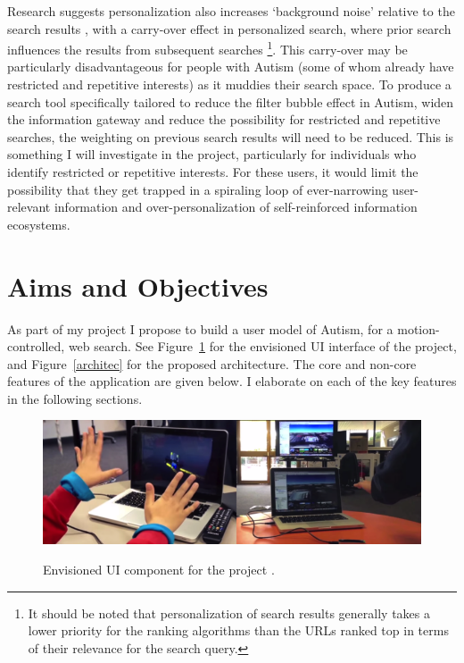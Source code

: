 \documentclass[a4paper, 11pt]{article}
\begin{document}
\begin{justify}
Research suggests personalization also increases ‘background noise’ relative to the search results \cite{briggs}, with a carry-over effect in personalized search, where prior search influences the results from subsequent searches \footnote{It should be noted that personalization of search results generally takes a lower priority for the ranking algorithms than the URLs ranked top in terms of their relevance for the search query.}. This carry-over may be particularly disadvantageous for people with Autism (some of whom already have restricted and repetitive interests) as it muddies their search space. To produce a search tool specifically tailored to reduce the filter bubble effect in Autism, widen the information gateway and reduce the possibility for restricted and repetitive searches, the weighting on previous search results will need to be reduced. This is something I will investigate in the project, particularly for individuals who identify restricted or repetitive interests. For these users, it would limit the possibility that they get trapped in a spiraling loop of ever-narrowing user-relevant information and over-personalization of self-reinforced information ecosystems.

\section{Aims and Objectives} 
As part of my project I propose to build a user model of Autism, for a motion-controlled, web search. See Figure~\ref{vision} for the envisioned UI interface of the project, and Figure~\ref{architec} for the proposed architecture. The core and non-core features of the application are given below. I elaborate on each of the key features in the following sections. 

\begin{figure}[H]
\begin{center}
\includegraphics[scale=0.6]{vision}\\
\caption{Envisioned UI component for the project \cite{leap}.}
\label{vision}
\end{center}
\end{figure}


\end{justify}
\end{document}
